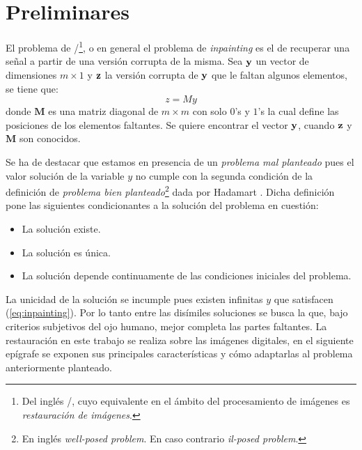 \chapter{Preliminares}\label{chapter:background}

\begin{definition}\label{def:inpainting}
	El problema de \II/\footnote{Del ingl\'es \II/, cuyo equivalente en el \'ambito del procesamiento de im\'agenes es \textit{restauraci\'on de im\'agenes}.}, o en general el problema de \textit{inpainting} es el de recuperar una señal a partir de una versi\'on corrupta de la misma. Sea $\mathbf{y}$ un vector de dimensiones $m \times 1$ y $\mathbf{z}$ la versi\'on corrupta de $\mathbf{y}$ que le faltan algunos elementos, se tiene que:
	\begin{equation}
		z = My
		\label{eq:inpainting}
	\end{equation}
	donde $\mathbf{M}$ es una matriz diagonal de $m \times m$ con solo $0$'s y $1$'s la cual define las posiciones de los elementos faltantes. Se quiere encontrar el vector $\mathbf{y}$, cuando $\mathbf{z}$ y  $\mathbf{M}$ son conocidos. 
\end{definition}

Se ha de destacar que estamos en presencia de un \textit{problema mal planteado} pues el valor soluci\'on de la variable $y$ no cumple con la segunda condición de la definición de \textit{problema bien planteado}\footnote{En ingl\'es \textit{well-posed problem}. En caso contrario \textit{il-posed problem}.} dada por Hadamart \cite{enwiki:wpp}. Dicha definición pone las siguientes condicionantes a la soluci\'on  del problema en cuestión:
\begin{itemize}
	\item La soluci\'on existe.
	\item La soluci\'on es \'unica.
	\item La soluci\'on depende continuamente de las condiciones iniciales del problema.
\end{itemize}
La unicidad de la soluci\'on se incumple pues existen infinitas $y$ que satisfacen (\ref{eq:inpainting}). Por lo tanto entre las dis\'imiles soluciones se busca la que, bajo criterios subjetivos del ojo humano, mejor completa las partes faltantes. La restauraci\'on en este trabajo se realiza sobre las im\'agenes digitales, en el siguiente ep\'igrafe se exponen sus principales características y c\'omo adaptarlas al problema anteriormente planteado. 

